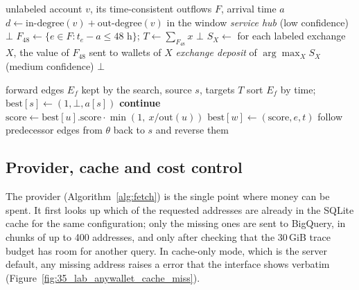 \begin{algorithm}[H]
\caption{\textsc{InferTerminal}: sweep rule and hub guard}\label{alg:sweep}
\small\singlespacing
\begin{algorithmic}[1]
\Require unlabeled account $v$, its time-consistent outflows $F$, arrival time $a$
\State $d\gets \mathrm{in\text{-}degree}(v)+\mathrm{out\text{-}degree}(v)$ in the window
 \State \Return \emph{service hub} (low confidence) \EndIf
{} \State \Return $\bot$ \EndIf
\State $F_{48}\gets\{e\in F: t_e-a\le 48\text{ h}\}$; $T\gets\sum_{F_{48}}x$
 \State \Return $\bot$ \EndIf
\State $S_X\gets$ for each labeled exchange $X$, the value of $F_{48}$ sent to wallets of $X$
 \State \Return \emph{exchange deposit} of $\arg\max_X S_X$ (medium confidence) \EndIf
\State \Return $\bot$
\end{algorithmic}
\end{algorithm}

\begin{algorithm}[H]
\caption{Evidence path (maximum-share time-respecting path)}\label{alg:path}
\small\singlespacing
\begin{algorithmic}[1]
\Require forward edges $E_f$ kept by the search, source $s$, targets $T$
\State sort $E_f$ by time; $\mathrm{best}[s]\gets(1,\bot,a[s])$
   \State \textbf{continue} \EndIf
  \State $\mathrm{score}\gets\mathrm{best}[u].\mathrm{score}\cdot\min(1,\ x/\mathrm{out}(u))$
   \State $\mathrm{best}[w]\gets(\mathrm{score},e,t)$ \EndIf
\EndFor
{} \State follow predecessor edges from $\theta$ back to $s$ and reverse them \EndFor
\end{algorithmic}
\end{algorithm}

\subsection{Provider, cache and cost control}
The provider (Algorithm~\ref{alg:fetch}) is the single point where money can be spent. It first looks up which of the requested addresses are already in the SQLite cache for the same configuration; only the missing ones are sent to BigQuery, in chunks of up to 400 addresses, and only after checking that the 30\,GiB trace budget has room for another query. In cache-only mode, which is the server default, any missing address raises a  error that the interface shows verbatim (Figure~\ref{fig:35_lab_anywallet_cache_miss}).

